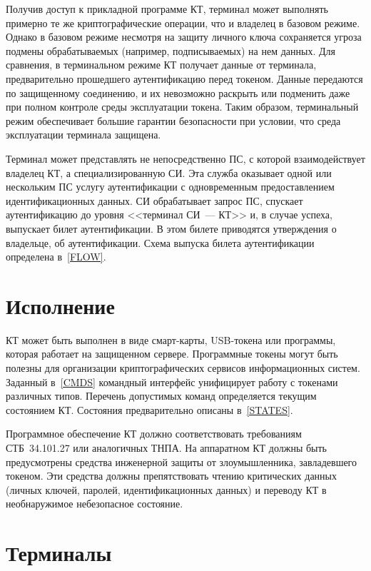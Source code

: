 Получив доступ к прикладной программе КТ, терминал может выполнять примерно те 
же криптографические операции, что и владелец в базовом режиме. Однако в 
базовом режиме несмотря на защиту личного ключа сохраняется угроза подмены 
обрабатываемых (например, подписываемых) на нем данных. Для сравнения, в 
терминальном режиме КТ получает данные от терминала, предварительно прошедшего 
аутентификацию перед токеном. Данные передаются по защищенному соединению, и их 
невозможно раскрыть или подменить даже при полном контроле среды эксплуатации 
токена. Таким образом, терминальный режим обеспечивает большие гарантии 
безопасности при условии, что среда эксплуатации терминала защищена.

Терминал может представлять не непосредственно ПС, с которой взаимодействует 
владелец КТ, а специализированную СИ. Эта служба оказывает одной или 
нескольким ПС услугу аутентификации с одновременным предоставлением 
идентификационных данных.
%
СИ обрабатывает запрос ПС, спускает аутентификацию до уровня <<терминал СИ~---
КТ>> и, в случае успеха, выпускает билет аутентификации. В этом билете
приводятся утверждения о владельце, об аутентификации. 
Схема выпуска билета аутентификации определена в~\ref{FLOW}.

\section{Исполнение} 

КТ может быть выполнен в виде смарт-карты, USB-токена 
или программы, которая работает на защищенном сервере. 
Программные токены могут быть полезны для организации криптографических 
сервисов информационных систем. 
%
Заданный в~\ref{CMDS} командный интерфейс 
унифицирует работу с токенами различных типов.
%
Перечень допустимых команд определяется текущим состоянием КТ.
%
Состояния предварительно описаны в~\ref{STATES}.

Программное обеспечение КТ должно соответствовать требованиям СТБ~34.101.27  или
аналогичных ТНПА. На аппаратном КТ должны быть предусмотрены средства инженерной
защиты от злоумышленника, завладевшего токеном. Эти средства должны
препятствовать чтению критических данных (личных ключей, паролей,
идентификационных данных) и переводу КТ в необнаружимое небезопасное состояние.

\section{Терминалы}

